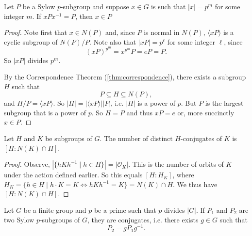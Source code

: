 \begin{lemma}\label{lem:conjugate_P_Sylow}
	Let $P$ be a Sylow $p$-subgroup and suppose $x\in G$ is such that $|x|=p^m$ for some integer $m$. If $xPx^{-1}=P$, then $x\in P$
\end{lemma}

\begin{proof}
	Note first that $x\in N(P)$ and, since $P$ is normal in $N(P)$, $\langle xP\rangle$ is a cyclic subgroup of $N(P)/P$. Note also that $|xP|=p^\ell$ for some integer $\ell$, since
	$$(xP)^{p^m}=x^{p^m}P=eP=P.$$
	So $|xP|$ divides $p^m$.

	By the Correspondence Theorem (\ref{thm:correspondence}), there exists a subgroup $H$ such that
	$$P\subseteq H\subseteq N(P),$$
	and $H/P=\langle xP\rangle$. So $|H|=|\langle xP\rangle||P|$, i.e. $|H|$ is a power of $p$. But $P$ is the largest subgroup that is a power of $p$. So $H=P$ and thus $xP=e$ or, more succinctly $x\in P$.
\end{proof}

\begin{lemma}\label{lem:distinct_H-conjugates}
	Let $H$ and $K$ be subgroups of $G$. The number of distinct $H$-conjugates of $K$ is $[H:N(K)\cap H]$.
\end{lemma}

\begin{proof}
	Observe, $|\{hKh^{-1}\mid h\in H\}|=|\mathcal O_K|$. This is the number of orbits of $K$ under the action defined earlier. So this equals $[H:H_K]$, where $H_K=\{h\in H\mid h\cdot K=K\Leftrightarrow hKh^{-1}=K\}=N(K)\cap H$. We thus have $[H:N(K)\cap H]$.
\end{proof}

\begin{theorem}\label{thm:sylow_2}
	Let $G$ be a finite group and $p$ be a prime such that $p$ divides $|G|$. If $P_1$ and $P_2$ are two Sylow $p$-subgroups of $G$, they are conjugates, i.e. there exists $g\in G$ such that
	$$P_2=gP_1g^{-1}.$$
\end{theorem}

